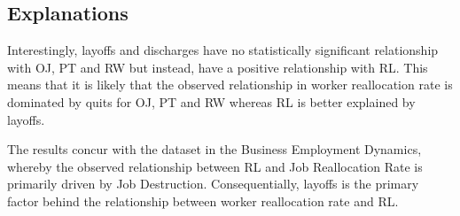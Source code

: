 \documentclass[
]{article}
\begin{document}
\hypertarget{explanations-2}{%
\subsection{Explanations}\label{explanations-2}}

Interestingly, layoffs and discharges have no statistically significant
relationship with OJ, PT and RW but instead, have a positive
relationship with RL. This means that it is likely that the observed
relationship in worker reallocation rate is dominated by quits for OJ,
PT and RW whereas RL is better explained by layoffs.

The results concur with the dataset in the Business Employment Dynamics,
whereby the observed relationship between RL and Job Reallocation Rate
is primarily driven by Job Destruction. Consequentially, layoffs is the
primary factor behind the relationship between worker reallocation rate
and RL.
\end{document}
